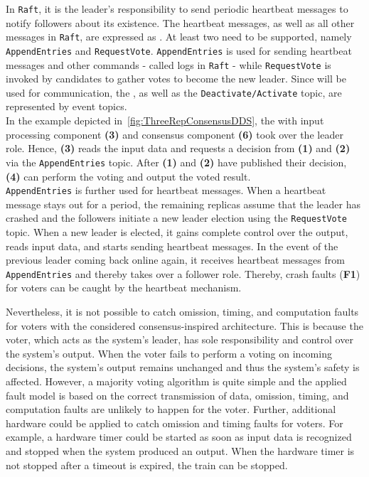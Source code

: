 In \texttt{Raft}, it is the leader's responsibility to send periodic heartbeat messages to notify followers about its existence.
The heartbeat messages, as well as all other messages in \texttt{Raft}, are expressed as .
At least two  need to be supported, namely \texttt{AppendEntries} and \texttt{RequestVote}.
\texttt{AppendEntries} is used for sending heartbeat messages and other commands - called logs in \texttt{Raft} - while \texttt{RequestVote} is invoked by candidates to gather votes to become the new leader.
Since  will be used for communication, the , as well as the \texttt{Deactivate/Activate} topic, are represented by  event topics.
\\

In the example depicted in~\autoref{fig:ThreeRepConsensusDDS}, the  with input processing component \textbf{(3)} and consensus component \textbf{(6)} took over the leader role.
Hence, \textbf{(3)} reads the input data and requests a decision from \textbf{(1)} and \textbf{(2)} via the \texttt{AppendEntries} topic.
After \textbf{(1)} and \textbf{(2)} have published their decision, \textbf{(4)} can perform the voting and output the voted result.
\\

\texttt{AppendEntries} is further used for heartbeat messages.
When a heartbeat message stays out for a period, the remaining replicas assume that the leader has crashed and the followers initiate a new leader election using the \texttt{RequestVote} topic.
When a new leader is elected, it gains complete control over the output, reads input data, and starts sending heartbeat messages.
In the event of the previous leader coming back online again, it receives heartbeat messages from \texttt{AppendEntries} and thereby takes over a follower role.
Thereby, crash faults (\textbf{F1}) for voters can be caught by the heartbeat mechanism.

Nevertheless, it is not possible to catch omission, timing, and computation faults for voters with the considered consensus-inspired architecture.
This is because the voter, which acts as the system's leader, has sole responsibility and control over the system's output.
When the voter fails to perform a voting on incoming decisions, the system's output remains unchanged and thus the system's safety is affected.
However, a majority voting algorithm is quite simple and the applied fault model is based on the correct transmission of data, omission, timing, and computation faults are unlikely to happen for the voter.
Further, additional hardware could be applied to catch omission and timing faults for voters.
For example, a hardware timer could be started as soon as input data is recognized and stopped when the system produced an output.
When the hardware timer is not stopped after a timeout is expired, the train can be stopped.
\\


